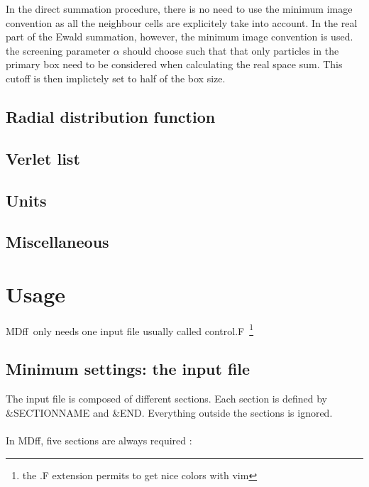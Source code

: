 \documentclass[a4paper]{article}
\newcommand{\MDFF}{{\sc MDff}}
\begin{document}
In the direct summation procedure, there is no need to use the minimum
 image convention as all the neighbour cells are explicitely take into account.
In the real part of the Ewald summation, however, the minimum image convention
is used. the screening parameter $\alpha$ should choose such that that only particles
in the primary box need to be considered when calculating the real space sum.
This cutoff is then implictely set to half of the box size.


\subsection{Radial distribution function\label{sec:GR}}

\subsection{Verlet list\label{sec:vnlist}}

\subsection{Units \label{sec:units}}

\subsection{Miscellaneous \label{sec:misc}}

\section{Usage}

\MDFF~only needs one input file usually called control.F~\footnote{the .F extension permits to get nice colors with vim} 

\subsection{Minimum settings: the input file}

The input file is composed of different sections. 
Each section is defined by  \&SECTIONNAME and \&END.
Everything outside the sections is ignored.
\\
\\
In \MDFF, five sections are always required :
\end{document}
